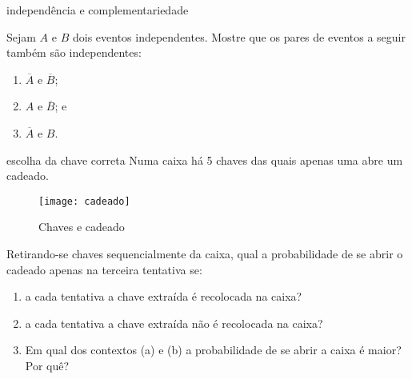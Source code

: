 \begin{task}{independência e complementariedade}


Sejam \(A\) e \(B\) dois eventos independentes.  Mostre que os pares de eventos a seguir também são independentes:
\begin{enumerate}
\item {} 
\(\overline{A}\) e \(\overline{B}\);

\item {} 
\(A\) e \(\overline{B}\); e

\item {} 
\(\overline{A}\) e \(B\).

\end{enumerate}
\end{task}

\begin{task}{escolha da chave correta}
Numa caixa há 5 chaves das quais apenas uma abre um cadeado.

\begin{figure}[H]
\centering
\texttt{[image: cadeado]}

\caption{Chaves e cadeado}
\label{}
\end{figure}
Retirando-se chaves sequencialmente da caixa, qual a probabilidade de se abrir o cadeado apenas na terceira tentativa se:
\begin{enumerate}
\item a cada tentativa a chave extraída é recolocada na caixa?
\item a cada tentativa a chave extraída não é recolocada na caixa?
\item Em qual dos contextos (a) e (b) a probabilidade de se abrir a caixa é maior? Por quê?
\end{enumerate}

\end{task}

